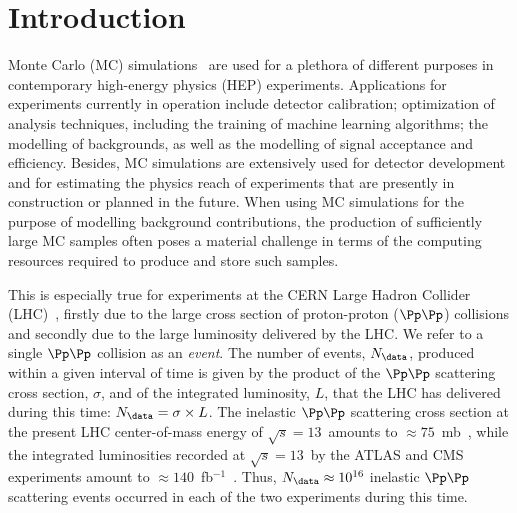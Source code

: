 \section{Introduction}
\label{sec:introduction}

Monte Carlo (MC) simulations~\cite{Kroese2014WhyTM,dunn2011exploring} are used for a plethora of different purposes in contemporary high-energy physics (HEP) experiments.
Applications for experiments currently in operation include detector calibration; optimization of analysis techniques, including the training of machine learning algorithms;
the modelling of backgrounds, as well as the modelling of signal acceptance and efficiency.
Besides, MC simulations are extensively used for detector development and for estimating the physics reach of experiments that are presently in construction or planned in the future.
When using MC simulations for the purpose of modelling background contributions,
the production of sufficiently large MC samples often poses a material challenge in terms of the computing resources required to produce and store such samples.

This is especially true for experiments at the CERN Large Hadron Collider (LHC)~\cite{Bruning:2004ej,Buning:2004wk,Benedikt:2004wm},
firstly due to the large cross section of proton-proton ($\Pp\Pp$) collisions and secondly due to the large luminosity delivered by the LHC.
We refer to a single $\Pp\Pp$ collision as an {\em event}.
The number of events, $N_{\data}$, produced within a given interval of time 
is given by the product of the $\Pp\Pp$ scattering cross section, $\sigma$, and of the integrated luminosity, $L$, that the LHC has delivered during this time:
$N_{\data} = \sigma \times L$.
The inelastic $\Pp\Pp$ scattering cross section at the present LHC center-of-mass energy of $\sqrt{s}=13$~\TeV amounts to $\approx 75$~mb~\cite{Aaboud:2016mmw,Sirunyan:2018nqx},
while the integrated luminosities recorded at $\sqrt{s}=13$~\TeV by the ATLAS and CMS experiments amount to $\approx 140$~fb$^{-1}$~\cite{ATLAS-CONF-2019-021,LUM-17-001,LUM-17-004,LUM-18-002}.
Thus, $N_{\data} \approx 10^{16}$ inelastic $\Pp\Pp$ scattering events occurred in each of the two experiments during this time.

